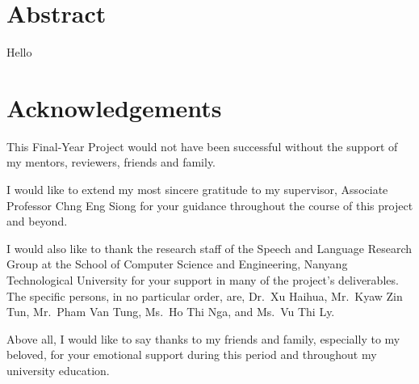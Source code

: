 \chapter*{Abstract}
Hello
\newpage

\chapter*{Acknowledgements}
This Final-Year Project would not have been successful without the support
of my mentors, reviewers, friends and family.

I would like to extend my most sincere gratitude to my supervisor,
Associate Professor Chng Eng Siong for your guidance throughout
the course of this project and beyond.

I would also like to thank the research staff of the Speech
and Language Research Group at the School of Computer Science and Engineering,
Nanyang Technological University for your support in many of the project's
deliverables. The specific persons, in no particular order, are, Dr.\ Xu Haihua,
Mr.\ Kyaw Zin Tun, Mr.\ Pham Van Tung, Ms.\ Ho Thi Nga, and Ms.\ Vu Thi Ly.

Above all, I would like to say thanks to my friends and family, especially to my
beloved, for your emotional support during this period and throughout my university
education.
\newpage

\tableofcontents
\newpage

\listoffigures
\newpage

\listoftables
\newpage
